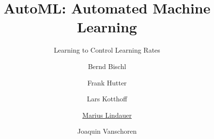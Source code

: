 




\title[AutoML: Learning to Configure]{AutoML: Automated Machine Learning}
\subtitle{Learning to Control Learning Rates}
\author[Marius Lindauer]{Bernd Bischl \and Frank Hutter \and Lars Kotthoff\newline \and \underline{Marius Lindauer} \and Joaquin Vanschoren}
\institute{}
\date{}





	
	\maketitle
	
